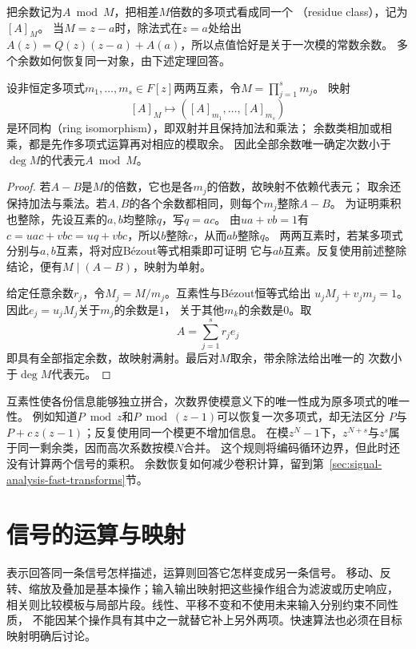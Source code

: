 把余数记为$A\bmod M$，把相差$M$倍数的多项式看成同一个
（residue class），记为$[A]_M$。
当$M=z-a$时，除法式在$z=a$处给出
$A(z)=Q(z)(z-a)+A(a)$，所以点值恰好是关于一次模的常数余数。
多个余数如何恢复同一对象，由下述定理回答。
\begin{theorem}[多项式中国剩余定理]
  \label{thm:signal-analysis-polynomial-crt}
  设非恒定多项式$m_1,\ldots,m_s\in F[z]$两两互素，令$M=\prod_{j=1}^s m_j$。
  映射
  \[
    [A]_M\longmapsto([A]_{m_1},\ldots,[A]_{m_s})
  \]
  是环同构（ring isomorphism），即双射并且保持加法和乘法；
  余数类相加或相乘，都是先作多项式运算再对相应的模取余。
  因此全部余数唯一确定次数小于$\deg M$的代表元$A\bmod M$。
\end{theorem}
\begin{proof}
  若$A-B$是$M$的倍数，它也是各$m_j$的倍数，故映射不依赖代表元；
  取余还保持加法与乘法。若$A,B$的各个余数都相同，则每个$m_j$整除$A-B$。
  为证明乘积也整除，先设互素的$a,b$均整除$q$，写$q=ac$。
  由$ua+vb=1$有$c=uac+vbc=uq+vbc$，所以$b$整除$c$，从而$ab$整除$q$。
  两两互素时，若某多项式分别与$a,b$互素，将对应Bézout等式相乘即可证明
  它与$ab$互素。反复使用前述整除结论，便有$M\mid(A-B)$，映射为单射。

  给定任意余数$r_j$，令$M_j=M/m_j$。互素性与Bézout恒等式给出
  $u_jM_j+v_jm_j=1$。因此$e_j=u_jM_j$关于$m_j$的余数是$1$，
  关于其他$m_k$的余数是$0$。取
  \[
    A=\sum_{j=1}^s r_je_j
  \]
  即具有全部指定余数，故映射满射。最后对$M$取余，带余除法给出唯一的
  次数小于$\deg M$代表元。
\end{proof}

互素性使各份信息能够独立拼合，次数界使模意义下的唯一性成为原多项式的唯一性。
例如知道$P\bmod z$和$P\bmod(z-1)$可以恢复一次多项式，却无法区分
$P$与$P+c\,z(z-1)$；反复使用同一个模更不增加信息。
在模$z^N-1$下，$z^{N+s}$与$z^s$属于同一剩余类，因而高次系数按模$N$合并。
这个规则将编码循环边界，但此时还没有计算两个信号的乘积。
余数恢复如何减少卷积计算，留到第~\ref{sec:signal-analysis-fast-transforms}节。

\section{信号的运算与映射}
\label{sec:signal-operations-maps}

表示回答同一条信号怎样描述，运算则回答它怎样变成另一条信号。
移动、反转、缩放及叠加是基本操作；输入输出映射把这些操作组合为滤波或历史响应，
相关则比较模板与局部片段。线性、平移不变和不使用未来输入分别约束不同性质，
不能因某个操作具有其中之一就替它补上另外两项。快速算法也必须在目标映射明确后讨论。

